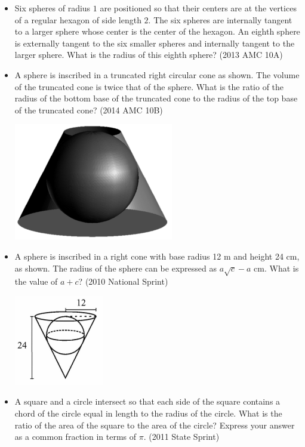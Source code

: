 \documentclass{article}
\begin{document}
\begin{itemize}
\item Six spheres of radius $1$ are positioned so that their centers are at the vertices of a regular hexagon of side length $2$. The six spheres are internally tangent to a larger sphere whose center is the center of the hexagon.  An eighth sphere is externally tangent to the six smaller spheres and internally tangent to the larger sphere.  What is the radius of this eighth sphere? (2013 AMC 10A)

\item A sphere is inscribed in a truncated right circular cone as shown. The volume of the truncated cone is twice that of the sphere. What is the ratio of the radius of the bottom base of the truncated cone to the radius of the top base of the truncated cone? (2014 AMC 10B)

\centerline{\includegraphics{201410B.png}}

\item A sphere is inscribed in a right cone with base radius 12 m and height 24 cm, as shown. The radius of the sphere can be expressed as $a\sqrt{c}-a$ cm. What is the value of $a+c$? (2010 National Sprint)

\centerline{\includegraphics{201029.png}}

\item A square and a circle intersect so that each side of the square contains a chord of the circle equal in length to the radius of the circle. What is the ratio of the area of the square to the area of the circle? Express your answer as a common fraction in terms of $\pi$. (2011 State Sprint)


\end{itemize}
\end{document}
